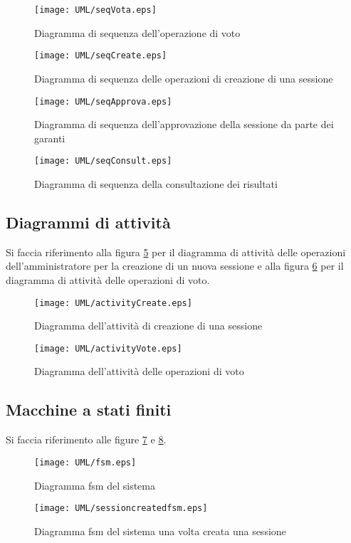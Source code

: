 \begin{figure}[ht]
	\centering
	\texttt{[image: UML/seqVota.eps]}
	\caption{Diagramma di sequenza dell'operazione di voto}
	\label{fig:seqdiagvota}
\end{figure}

\begin{figure}[ht]
	\centering
	\texttt{[image: UML/seqCreate.eps]}
	\caption{Diagramma di sequenza delle operazioni di creazione di una sessione}
	\label{fig:seqdiagcreate}
\end{figure}

\begin{figure}[ht]
	\centering
	\texttt{[image: UML/seqApprova.eps]}
	\caption{Diagramma di sequenza dell'approvazione della sessione da parte dei garanti}
	\label{fig:seqdiagapprova}
\end{figure}

\begin{figure}[ht]
	\centering
	\texttt{[image: UML/seqConsult.eps]}
	\caption{Diagramma di sequenza della consultazione dei risultati}
	\label{fig:seqdiagconsult}
\end{figure}


\subsection{Diagrammi di attività}
Si faccia riferimento alla figura \ref{fig:activitydiagcreate} per il diagramma di attività delle operazioni dell'amministratore per la creazione di un nuova sessione e alla figura \ref{fig:activitydiagvote} per il diagramma di attività delle operazioni di voto.
\begin{figure}[ht]
	\centering
	\texttt{[image: UML/activityCreate.eps]}
	\caption{Diagramma dell'attività di creazione di una sessione}
	\label{fig:activitydiagcreate}
\end{figure}


\begin{figure}[ht]
	\centering
	\texttt{[image: UML/activityVote.eps]}
	\caption{Diagramma dell'attività delle operazioni di voto}
	\label{fig:activitydiagvote}
\end{figure}

\subsection{Macchine a stati finiti}
Si faccia riferimento alle figure \ref{fig:fsm} e \ref{fig:sessionCreatedFsm}.
\begin{figure}[ht]
	\centering
	\texttt{[image: UML/fsm.eps]}
	\caption{Diagramma fsm del sistema}
	\label{fig:fsm}
\end{figure}
\begin{figure}[ht]
	\centering
	\texttt{[image: UML/sessioncreatedfsm.eps]}
	\caption{Diagramma fsm del sistema una volta creata una sessione}
	\label{fig:sessionCreatedFsm}
\end{figure}



